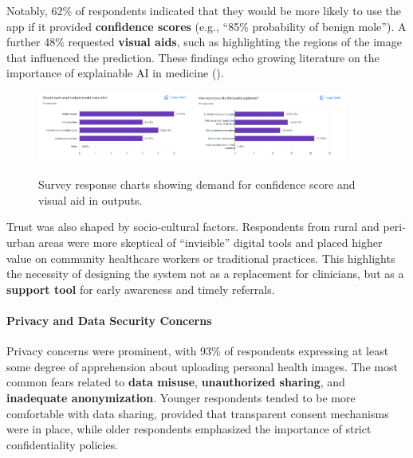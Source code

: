 \documentclass[
  12pt,
  oneside]{article}
\begin{document}
Notably, 62\% of respondents indicated that they would be more likely to
use the app if it provided \textbf{confidence scores} (e.g., ``85\%
probability of benign mole''). A further 48\% requested \textbf{visual
aids}, such as highlighting the regions of the image that influenced the
prediction. These findings echo growing literature on the importance of
explainable AI in medicine ().

\begin{figure}[h!]
    \centering
    \includegraphics[width=0.45\textwidth]{confidence-score-chart.png}
    \hfill
    \includegraphics[width=0.45\textwidth]{visual-aids-chart.png}
    \caption{Survey response charts showing demand for confidence score and visual aid in outputs.}
\end{figure}

Trust was also shaped by socio-cultural factors. Respondents from rural
and peri-urban areas were more skeptical of ``invisible'' digital tools
and placed higher value on community healthcare workers or traditional
practices. This highlights the necessity of designing the system not as
a replacement for clinicians, but as a \textbf{support tool} for early
awareness and timely referrals.

\paragraph{Privacy and Data Security
Concerns}\label{privacy-and-data-security-concerns}

Privacy concerns were prominent, with 93\% of respondents expressing at
least some degree of apprehension about uploading personal health
images. The most common fears related to \textbf{data misuse},
\textbf{unauthorized sharing}, and \textbf{inadequate anonymization}.
Younger respondents tended to be more comfortable with data sharing,
provided that transparent consent mechanisms were in place, while older
respondents emphasized the importance of strict confidentiality
policies.
\end{document}
